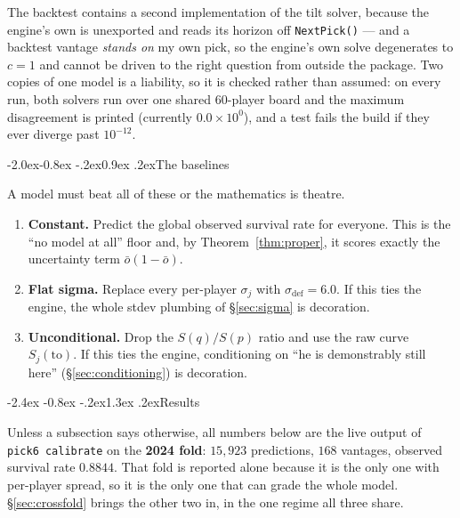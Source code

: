 \documentclass[10pt,a4paper]{article}
\makeatletter
\theoremstyle{plain}
\theoremstyle{definition}
\theoremstyle{remark}
\newcommand{\code}[1]{\texttt{\small #1}}
\renewcommand\section{\@startsection{section}{1}{\z@}%
  {-2.4ex \@plus -0.8ex \@minus -.2ex}{1.3ex \@plus.2ex}{\normalfont\Large\bfseries}}
\renewcommand\subsection{\@startsection{subsection}{2}{\z@}%
  {-2.0ex\@plus -0.8ex \@minus -.2ex}{0.9ex \@plus .2ex}{\normalfont\large\bfseries}}
\makeatother
\begin{document}
The backtest contains a second implementation of the tilt solver, because the engine's
own is unexported and reads its horizon off \code{NextPick()} --- and a backtest vantage
\emph{stands on} my own pick, so the engine's own solve degenerates to $c = 1$ and cannot
be driven to the right question from outside the package. Two copies of one model is a
liability, so it is checked rather than assumed: on every run, both solvers run over one
shared 60-player board and the maximum disagreement is printed (currently
$0.0\times10^{0}$), and a test fails the build if they ever diverge past $10^{-12}$.

\subsection{The baselines}

A model must beat all of these or the mathematics is theatre.

\begin{enumerate}
\item[(a)] \textbf{Constant.} Predict the global observed survival rate for everyone.
This is the ``no model at all'' floor and, by Theorem~\ref{thm:proper}, it scores exactly
the uncertainty term $\bar o(1-\bar o)$.
\item[(b)] \textbf{Flat sigma.} Replace every per-player $\sigma_j$ with
$\sigma_{\text{def}} = 6.0$. If this ties the engine, the whole stdev plumbing of
\S\ref{sec:sigma} is decoration.
\item[(c)] \textbf{Unconditional.} Drop the $S(q)/S(p)$ ratio and use the raw curve
$S_j(\text{to})$. If this ties the engine, conditioning on ``he is demonstrably still
here'' (\S\ref{sec:conditioning}) is decoration.
\end{enumerate}

\section{Results}
\label{sec:results}

Unless a subsection says otherwise, all numbers below are the live output of
\code{pick6 calibrate} on the \textbf{2024 fold}: $15{,}923$ predictions, $168$ vantages,
observed survival rate $0.8844$. That fold is reported alone because it is the only one
with per-player spread, so it is the only one that can grade the whole model.
\S\ref{sec:crossfold} brings the other two in, in the one regime all three share.
\end{document}
